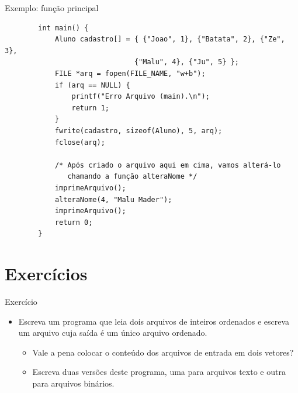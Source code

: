 \documentclass[handout]{beamer}
\begin{document}
\begin{frame}[fragile]{Exemplo: função principal}

    \begin{verbatim}
        int main() {
            Aluno cadastro[] = { {"Joao", 1}, {"Batata", 2}, {"Ze", 3},
                               {"Malu", 4}, {"Ju", 5} };
            FILE *arq = fopen(FILE_NAME, "w+b");
            if (arq == NULL) {
                printf("Erro Arquivo (main).\n");
                return 1;
            }
            fwrite(cadastro, sizeof(Aluno), 5, arq);
            fclose(arq);

            /* Após criado o arquivo aqui em cima, vamos alterá-lo
               chamando a função alteraNome */
            imprimeArquivo();
            alteraNome(4, "Malu Mader");
            imprimeArquivo();
            return 0;
        }
    \end{verbatim}

\end{frame}

\section{Exercícios}

\begin{frame}{Exercício}

    \begin{itemize}
        \item Escreva um programa que leia dois arquivos de inteiros
        ordenados e escreva um arquivo cuja saída é um único arquivo
        ordenado.
        \begin{itemize}
            \item Vale a pena colocar o conteúdo dos arquivos de entrada em
            dois vetores?
            \item Escreva duas versões deste programa, uma para arquivos
            texto e outra para arquivos binários.
        \end{itemize}
    \end{itemize}

\end{frame}
\end{document}
